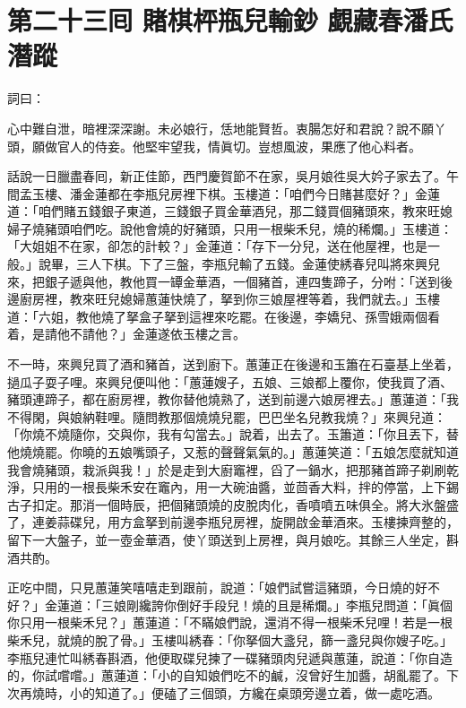 
\chapter*{第二十三囘 賭棋枰瓶兒輸鈔 覷藏春潘氏潛蹤}


詞曰：

\begin{myquote} 
心中難自泄，暗裡深深謝。未必娘行，恁地能賢哲。衷腸怎好和君說？說不願丫頭，願做官人的侍妾。他堅牢望我，情眞切。豈想風波，果應了他心料者。

\end{myquote} 

話說一日臘盡春囘，新正佳節，西門慶賀節不在家，吳月娘徃吳大妗子家去了。午間孟玉樓、潘金蓮都在李瓶兒房裡下棋。玉樓道：「咱們今日賭甚麼好？」金蓮道：「咱們賭五錢銀子東道，三錢銀子買金華酒兒，那二錢買個豬頭來，教來旺媳婦子燒豬頭咱們吃。說他會燒的好豬頭，只用一根柴禾兒，燒的稀爛。」玉樓道：「大姐姐不在家，卻怎的計較？」金蓮道：「存下一分兒，送在他屋裡，也是一般。」說畢，三人下棋。下了三盤，李瓶兒輸了五錢。{}金蓮使綉春兒叫將來興兒來，把銀子遞與他，教他買一罈金華酒，一個豬首，連四隻蹄子，分咐：「送到後邊廚房裡，教來旺兒媳婦蕙蓮快燒了，拏到你三娘屋裡等着，我們就去。」玉樓道：「六姐，教他燒了拏盒子拏到這裡來吃罷。在後邊，李嬌兒、孫雪娥兩個看着，是請他不請他？」{}金蓮遂依玉樓之言。

不一時，來興兒買了酒和豬首，送到廚下。蕙蓮正在後邊和玉簫在石臺基上坐着，撾瓜子耍子哩。來興兒便叫他：「蕙蓮嫂子，五娘、三娘都上覆你，使我買了酒、豬頭連蹄子，都在廚房裡，教你替他燒熟了，送到前邊六娘房裡去。」蕙蓮道：「我不得閑，與娘納鞋哩。隨問教那個燒燒兒罷，巴巴坐名兒教我燒？」來興兒道：「你燒不燒隨你，交與你，我有勾當去。」說着，出去了。玉簫道：「你且丟下，替他燒燒罷。你曉的五娘嘴頭子，又惹的聲聲氣氣的。」蕙蓮笑道：「五娘怎麼就知道我會燒豬頭，栽派與我！」於是走到大廚竈裡，舀了一鍋水，把那豬首蹄子剃刷乾淨，只用的一根長柴禾安在竈內，用一大碗油醬，並茴香大料，拌的停當，上下錫古子扣定。那消一個時辰，把個豬頭燒的皮脫肉化，香噴噴五味俱全。將大氷盤盛了，連姜蒜碟兒，用方盒拏到前邊李瓶兒房裡，旋開啟金華酒來。玉樓揀齊整的，留下一大盤子，並一壺金華酒，使丫頭送到上房裡，與月娘吃。其餘三人坐定，斟酒共酌。

正吃中間，只見蕙蓮笑嘻嘻走到跟前，說道：「娘們試嘗這豬頭，今日燒的好不好？」金蓮道：「三娘剛纔誇你倒好手段兒！燒的且是稀爛。」李瓶兒問道：「眞個你只用一根柴禾兒？」蕙蓮道：「不瞞娘們說，還消不得一根柴禾兒哩！若是一根柴禾兒，就燒的脫了骨。」玉樓叫綉春：「你拏個大盞兒，篩一盞兒與你嫂子吃。」李瓶兒連忙叫綉春斟酒，他便取碟兒揀了一碟豬頭肉兒遞與蕙蓮，說道：「你自造的，你試嚐嚐。」蕙蓮道：「小的自知娘們吃不的鹹，沒曾好生加醬，胡亂罷了。下次再燒時，小的知道了。」{}便磕了三個頭，方纔在桌頭旁邊立着，做一處吃酒。

